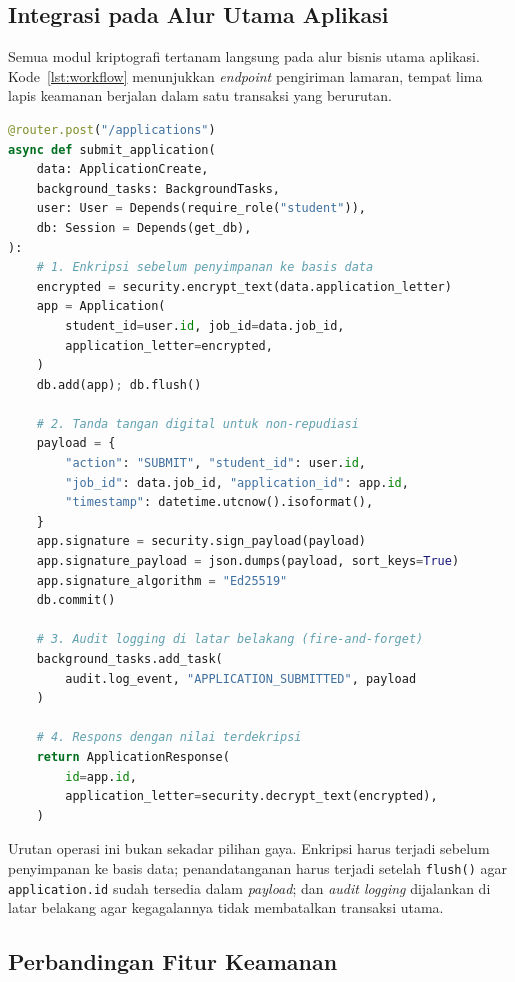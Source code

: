 \documentclass[12pt,a4paper]{article}
\begin{document}
\subsection{Integrasi pada Alur Utama Aplikasi}

Semua modul kriptografi tertanam langsung pada alur bisnis utama
aplikasi. Kode~\ref{lst:workflow} menunjukkan \textit{endpoint}
pengiriman lamaran, tempat lima lapis keamanan berjalan dalam satu
transaksi yang berurutan.

\begin{lstlisting}[language=Python,
  caption={Alur pengiriman lamaran: validasi token dan peran,
           enkripsi kolom, tanda tangan digital, audit logging,
           dan dekripsi untuk respons},
  label={lst:workflow}]
@router.post("/applications")
async def submit_application(
    data: ApplicationCreate,
    background_tasks: BackgroundTasks,
    user: User = Depends(require_role("student")),
    db: Session = Depends(get_db),
):
    # 1. Enkripsi sebelum penyimpanan ke basis data
    encrypted = security.encrypt_text(data.application_letter)
    app = Application(
        student_id=user.id, job_id=data.job_id,
        application_letter=encrypted,
    )
    db.add(app); db.flush()

    # 2. Tanda tangan digital untuk non-repudiasi
    payload = {
        "action": "SUBMIT", "student_id": user.id,
        "job_id": data.job_id, "application_id": app.id,
        "timestamp": datetime.utcnow().isoformat(),
    }
    app.signature = security.sign_payload(payload)
    app.signature_payload = json.dumps(payload, sort_keys=True)
    app.signature_algorithm = "Ed25519"
    db.commit()

    # 3. Audit logging di latar belakang (fire-and-forget)
    background_tasks.add_task(
        audit.log_event, "APPLICATION_SUBMITTED", payload
    )

    # 4. Respons dengan nilai terdekripsi
    return ApplicationResponse(
        id=app.id,
        application_letter=security.decrypt_text(encrypted),
    )
\end{lstlisting}

Urutan operasi ini bukan sekadar pilihan gaya. Enkripsi harus terjadi
sebelum penyimpanan ke basis data; penandatanganan harus terjadi setelah
\texttt{flush()} agar \texttt{application.id} sudah tersedia dalam
\textit{payload}; dan \textit{audit logging} dijalankan di latar
belakang agar kegagalannya tidak membatalkan transaksi utama.

\subsection{Perbandingan Fitur Keamanan}
\end{document}
